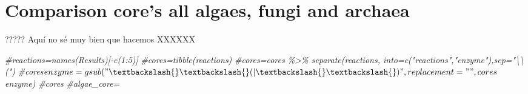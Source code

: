 \documentclass[
  letterpaper,
  DIV=11,
  numbers=noendperiod]{scrreprt}
\newenvironment{Shaded}{}{}
\newcommand{\CommentTok}[1]{\textcolor[rgb]{0.36,0.39,0.44}{\textit{#1}}}
\newcommand{\FunctionTok}[1]{\textcolor[rgb]{0.38,0.69,0.94}{#1}}
\newcommand{\NormalTok}[1]{\textcolor[rgb]{0.67,0.70,0.75}{#1}}
\newcommand{\OtherTok}[1]{\textcolor[rgb]{0.15,0.68,0.38}{#1}}
\newcommand{\SpecialCharTok}[1]{\textcolor[rgb]{0.34,0.71,0.76}{#1}}
\begin{document}
\hypertarget{comparison-cores-all-algaes-fungi-and-archaea}{%
\section{Comparison core's all algaes, fungi and
archaea}\label{comparison-cores-all-algaes-fungi-and-archaea}}

????? Aquí no sé muy bien que hacemos XXXXXX

\begin{Shaded}
\begin{Highlighting}[]
\CommentTok{\#reactions=names(Results)[{-}c(1:5)]}
\CommentTok{\#cores=tibble(reactions)}
\CommentTok{\#cores=cores \%\textgreater{}\%  separate(reactions, into=c("reactions","enzyme"),sep="\textbackslash{}\textbackslash{}(")}
\CommentTok{\#cores$enzyme=gsub("\textbackslash{}\textbackslash{}(|\textbackslash{}\textbackslash{})",replacement = "",cores$enzyme)}
\CommentTok{\#cores}
\CommentTok{\#algae\_core=}
\end{Highlighting}
\end{Shaded}

\begin{Shaded}
\end{Shaded}
\end{document}
